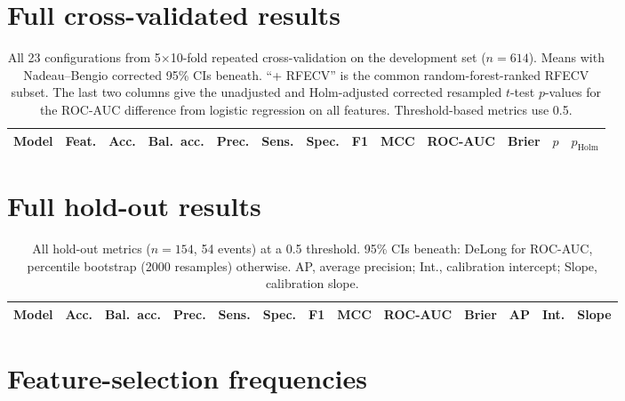 \documentclass[11pt]{article}
\begin{document}
\section{Full cross-validated results}

\begin{landscape}
\begin{table}[p]
\centering
\caption{All 23 configurations from 5$\times$10-fold repeated cross-validation on the development set ($n=614$). Means with Nadeau--Bengio corrected 95\% CIs beneath. ``+ RFECV'' is the common random-forest-ranked RFECV subset. The last two columns give the unadjusted and Holm-adjusted corrected resampled $t$-test $p$-values for the ROC-AUC difference from logistic regression on all features. Threshold-based metrics use 0.5.}
\label{tab:s-cv}
\scriptsize
\setlength{\tabcolsep}{2.5pt}
\begin{tabular}{lrcccccccccrr}
\toprule
Model & Feat. & Acc. & Bal.\ acc. & Prec. & Sens. & Spec. & F1 & MCC & ROC-AUC & Brier & $p$ & $p_{\mathrm{Holm}}$ \\
\midrule

\end{tabular}
\end{table}
\end{landscape}
\restoregeometry

\section{Full hold-out results}

\begin{landscape}
\begin{table}[p]
\centering
\caption{All hold-out metrics ($n=154$, 54 events) at a 0.5 threshold. 95\% CIs beneath: DeLong for ROC-AUC, percentile bootstrap (2000 resamples) otherwise. AP, average precision; Int., calibration intercept; Slope, calibration slope.}
\label{tab:s-holdout}
\scriptsize
\setlength{\tabcolsep}{3pt}
\begin{tabular}{lcccccccccccc}
\toprule
Model & Acc. & Bal.\ acc. & Prec. & Sens. & Spec. & F1 & MCC & ROC-AUC & Brier & AP & Int. & Slope \\
\midrule

\end{tabular}
\end{table}
\end{landscape}
\restoregeometry

\section{Feature-selection frequencies}
\end{document}
